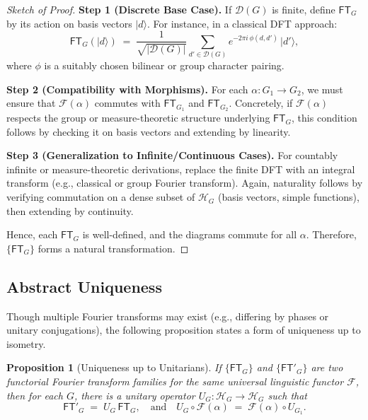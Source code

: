 \documentclass[11pt]{article}
\newtheorem{proposition}{Proposition}[section]
\begin{document}
\begin{proof}[Sketch of Proof]
\noindent
\textbf{Step 1 (Discrete Base Case).}  
If \(\mathcal{D}(G)\) is finite, define \(\mathsf{FT}_G\) by its action on basis vectors \(\lvert d\rangle\). For instance, in a classical DFT approach:
\[
 \mathsf{FT}_G(\lvert d\rangle) 
 \;=\;
 \frac{1}{\sqrt{|\mathcal{D}(G)|}}
 \sum_{d' \in \mathcal{D}(G)} e^{-2\pi i \,\phi(d, d')} \,\lvert d'\rangle,
\]
where \(\phi\) is a suitably chosen bilinear or group character pairing.

\noindent
\textbf{Step 2 (Compatibility with Morphisms).}  
For each \(\alpha: G_1 \to G_2\), we must ensure that \(\mathcal{F}(\alpha)\) commutes with \(\mathsf{FT}_{G_1}\) and \(\mathsf{FT}_{G_2}\). Concretely, if \(\mathcal{F}(\alpha)\) respects the group or measure-theoretic structure underlying \(\mathsf{FT}_G\), this condition follows by checking it on basis vectors and extending by linearity.

\noindent
\textbf{Step 3 (Generalization to Infinite/Continuous Cases).}  
For countably infinite or measure-theoretic derivations, replace the finite DFT with an integral transform (e.g., classical or group Fourier transform). Again, naturality follows by verifying commutation on a dense subset of \(\mathcal{H}_G\) (basis vectors, simple functions), then extending by continuity.

\noindent
Hence, each \(\mathsf{FT}_G\) is well-defined, and the diagrams commute for all \(\alpha\). Therefore, \(\{\mathsf{FT}_G\}\) forms a natural transformation.
\end{proof}

\subsection{Abstract Uniqueness}

Though multiple Fourier transforms may exist (e.g., differing by phases or unitary conjugations), the following proposition states a form of uniqueness up to isometry.

\begin{proposition}[Uniqueness up to Unitarians]
If \(\{\mathsf{FT}_G\}\) and \(\{\mathsf{FT}'_G\}\) are two functorial Fourier transform families for the same universal linguistic functor \(\mathcal{F}\), then for each \(G\), there is a unitary operator \(U_G : \mathcal{H}_G \to \mathcal{H}_G\) such that
\[
 \mathsf{FT}'_G \;=\; U_G \,\mathsf{FT}_G,
 \quad
 \text{and}
 \quad
 U_G \circ \mathcal{F}(\alpha) \;=\; \mathcal{F}(\alpha) \circ U_{G_1}.
\]
\end{proposition}
\end{document}
